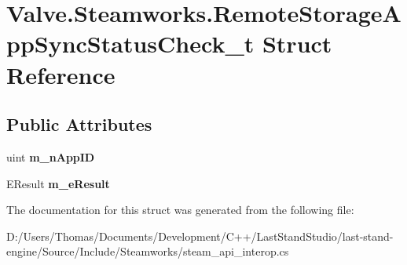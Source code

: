 \hypertarget{structValve_1_1Steamworks_1_1RemoteStorageAppSyncStatusCheck__t}{}\section{Valve.\+Steamworks.\+Remote\+Storage\+App\+Sync\+Status\+Check\+\_\+t Struct Reference}
\label{structValve_1_1Steamworks_1_1RemoteStorageAppSyncStatusCheck__t}
\subsection*{Public Attributes}
\begin{DoxyCompactItemize}
\item 
\hypertarget{structValve_1_1Steamworks_1_1RemoteStorageAppSyncStatusCheck__t_adc08697f3ba7bb5de65352da564a7c77}{}uint {\bfseries m\+\_\+n\+App\+I\+D}\label{structValve_1_1Steamworks_1_1RemoteStorageAppSyncStatusCheck__t_adc08697f3ba7bb5de65352da564a7c77}

\item 
\hypertarget{structValve_1_1Steamworks_1_1RemoteStorageAppSyncStatusCheck__t_ae81ba6c3de5c4ddb383df64f87ad2558}{}E\+Result {\bfseries m\+\_\+e\+Result}\label{structValve_1_1Steamworks_1_1RemoteStorageAppSyncStatusCheck__t_ae81ba6c3de5c4ddb383df64f87ad2558}

\end{DoxyCompactItemize}


The documentation for this struct was generated from the following file\+:\begin{DoxyCompactItemize}
\item 
D\+:/\+Users/\+Thomas/\+Documents/\+Development/\+C++/\+Last\+Stand\+Studio/last-\/stand-\/engine/\+Source/\+Include/\+Steamworks/steam\+\_\+api\+\_\+interop.\+cs\end{DoxyCompactItemize}
